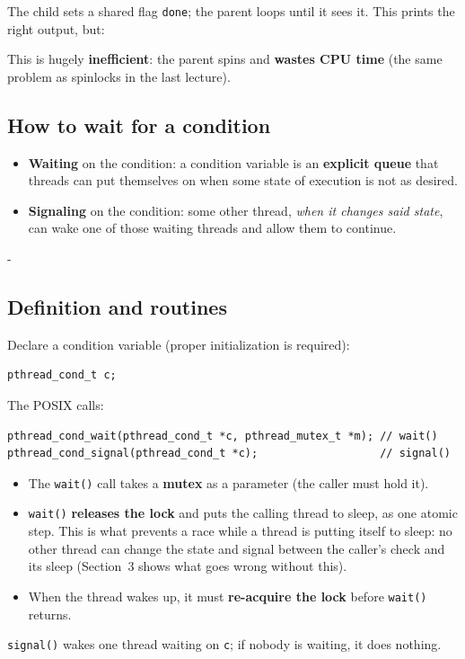 \documentclass[11pt,a4paper]{article}
\makeatletter
\newcommand{\keepspace}[1]{\par\penalty-100\begingroup
  \setlength{\dimen@}{#1}\dimen@ii\pagegoal\advance\dimen@ii-\pagetotal
  \ifdim\dimen@>\dimen@ii\ifdim\dimen@ii>\z@\vfil\fi\break\fi\endgroup}
\makeatother
\begin{document}
The child sets a shared flag \texttt{done}; the parent loops until it sees
it. This prints the right output, but:

\begin{warnbox}[Spinning]
This is hugely \textbf{inefficient}: the parent spins and \textbf{wastes CPU
time} (the same problem as spinlocks in the last lecture).
\end{warnbox}

\subsection{How to wait for a condition}

\begin{defbox}
\begin{itemize}
  \item \textbf{Waiting} on the condition: a condition variable is an
        \textbf{explicit queue} that threads can put themselves on when
        some state of execution is not as desired.
  \item \textbf{Signaling} on the condition: some other thread, \emph{when
        it changes said state}, can wake one of those waiting threads and
        allow them to continue.
\end{itemize}
\end{defbox}

\keepspace{20\baselineskip}
\subsection{Definition and routines}

Declare a condition variable (proper initialization is required):
\begin{lstlisting}[numbers=none]
pthread_cond_t c;
\end{lstlisting}

The POSIX calls:
\begin{lstlisting}[numbers=none]
pthread_cond_wait(pthread_cond_t *c, pthread_mutex_t *m); // wait()
pthread_cond_signal(pthread_cond_t *c);                   // signal()
\end{lstlisting}

\begin{keybox}
\begin{itemize}
  \item The \texttt{wait()} call takes a \textbf{mutex} as a parameter (the
        caller must hold it).
  \item \texttt{wait()} \textbf{releases the lock} and puts the calling
        thread to sleep, as one atomic step. This is what prevents a race
        while a thread is putting itself to sleep: no other thread can
        change the state and signal between the caller's check and its
        sleep (Section~3 shows what goes wrong without this).
  \item When the thread wakes up, it must \textbf{re-acquire the lock}
        before \texttt{wait()} returns.
\end{itemize}
\texttt{signal()} wakes one thread waiting on \texttt{c}; if nobody is
waiting, it does nothing.
\end{keybox}
\end{document}
